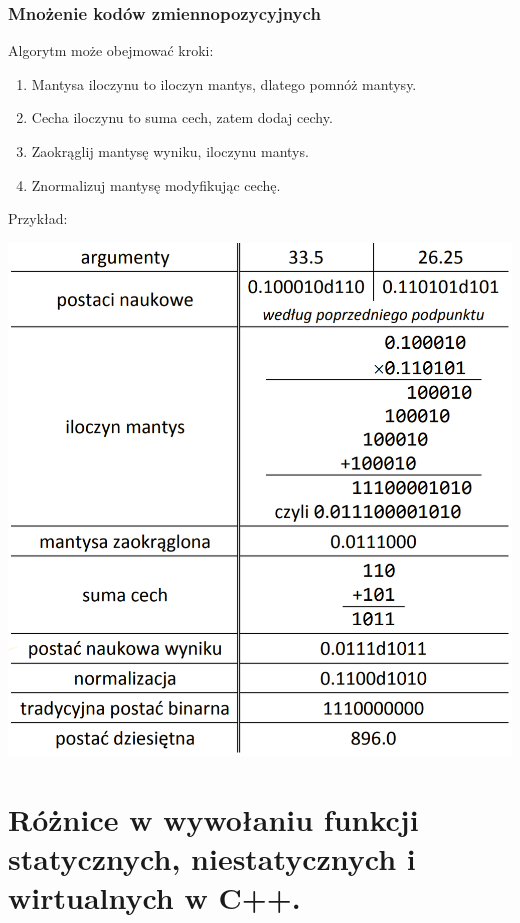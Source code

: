 \documentclass[12pt]{article}
\begin{document}
    \subsubsection{Mnożenie kodów zmiennopozycyjnych}
    Algorytm może obejmować kroki:
    \begin{enumerate}
        \item Mantysa iloczynu to iloczyn mantys, dlatego
        pomnóż mantysy.
        \item Cecha iloczynu to suma cech, zatem dodaj
        cechy.
        \item Zaokrąglij mantysę wyniku, iloczynu mantys.
        \item Znormalizuj mantysę modyfikując cechę.
    \end{enumerate}
    Przykład:\\
    \begin{center}
        \includegraphics[scale=0.4]{graphics/number-repr/fl-pt-mult.png}
    \end{center}

    \newpage
    \section{Różnice w wywołaniu funkcji statycznych, niestatycznych i wirtualnych w C++.}
\end{document}
